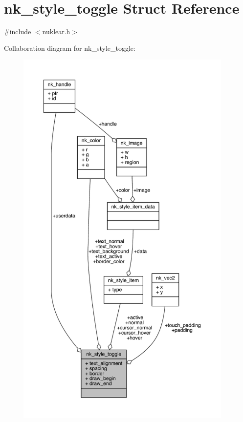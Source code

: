 \hypertarget{structnk__style__toggle}{}\section{nk\+\_\+style\+\_\+toggle Struct Reference}
\label{structnk__style__toggle}


{\ttfamily \#include $<$nuklear.\+h$>$}



Collaboration diagram for nk\+\_\+style\+\_\+toggle\+:
\nopagebreak
\begin{figure}[H]
\begin{center}
\leavevmode
\includegraphics[height=550pt]{structnk__style__toggle__coll__graph}
\end{center}
\end{figure}
